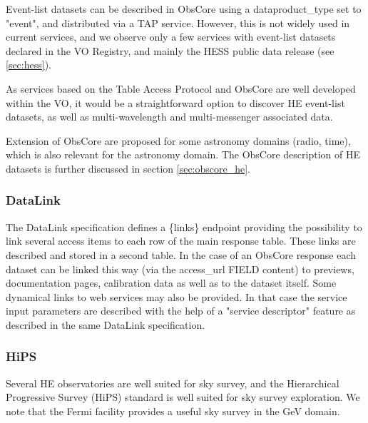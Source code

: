 \documentclass[11pt,a4paper]{ivoa}
\begin{document}
{Event-list datasets can be described in ObsCore using a dataproduct\_type set to "event", and distributed via a \gls{TAP} service. However, this is not widely used in current services, and we observe only a few services with event-list datasets declared in the \gls{VO} Registry, and mainly the \gls{HESS} public data release (see \ref{sec:hess}).

As services based on the Table Access Protocol \citep{2019ivoa.spec.0927D} and ObsCore are well developed within the \gls{VO}, it would be a straightforward option to discover \gls{HE} event-list datasets, as well as multi-wavelength and multi-messenger associated data.

Extension of ObsCore are proposed for some astronomy domains (radio, time), which is also relevant for the astronomy domain. The ObsCore description of \gls{HE} datasets is further discussed in section \ref{sec:obscore_he}.



\subsubsection{DataLink}


The DataLink specification \citep{2023ivoa.spec.1215B} defines a \{links\} endpoint providing the possibility to link several
access items to each row of the main response table. These links are described and stored in a second
table. In the case of an ObsCore response each dataset can be linked this way (via the access\_url
FIELD content) to previews, documentation pages, calibration data as well as to the dataset itself.
Some dynamical links to web services may also be provided. In that case the service input parameters are
described with the help of a "service descriptor" feature as described in the same DataLink specification.

\subsubsection{HiPS}

Several \gls{HE} observatories are well suited for sky survey, and the Hierarchical Progressive Survey (HiPS) standard is well suited for sky survey exploration. We note that the Fermi facility provides a useful sky survey in the GeV domain.


}
\end{document}

